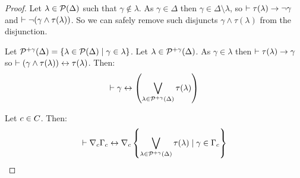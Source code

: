 \begin{proof}
Let $\lambda \in \mathcal{P}(\Delta)$ such that $\gamma \notin \lambda$.
As $\gamma \in \Delta$ then $\gamma \in \Delta \setminus \lambda$, so $\vdash \tau(\lambda) \rightarrow \lnot \gamma$ and $\vdash \lnot (\gamma \land \tau(\lambda))$.
So we can safely remove such disjuncts $\gamma \land \tau(\lambda)$ from the disjunction.

Let $\mathcal{P}^{+\gamma}(\Delta) = \{\lambda \in \mathcal{P}(\Delta) \mid \gamma \in \lambda\}$.
Let $\lambda \in \mathcal{P}^{+\gamma}(\Delta)$.
As $\gamma \in \lambda$ then $\vdash \tau(\lambda) \rightarrow \gamma$ so $\vdash (\gamma \land \tau(\lambda)) \leftrightarrow \tau(\lambda)$.
Then:
$$
\vdash \gamma \leftrightarrow \left(\bigvee_{\lambda \in \mathcal{P}^{+\gamma}(\Delta)} \tau(\lambda)\right)
$$

Let $c \in C$.
Then:
$$
\vdash \nabla_{c} \Gamma_c \leftrightarrow \nabla_{c} \left\{\bigvee_{\lambda \in \mathcal{P}^{+\gamma}(\Delta)} \tau(\lambda) \mid \gamma \in \Gamma_c\right\}
$$


\end{proof}
